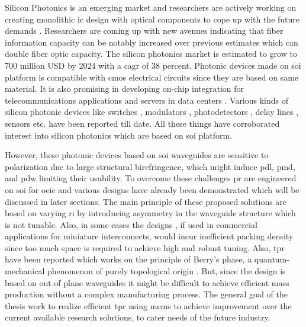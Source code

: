 \documentclass[../report.tex]{subfiles}
\begin{document}
Silicon Photonics is an emerging market and researchers are actively working on creating monolithic \gls{ic} design with optical components to cope up with the future demands \cite{optical_linking}. Researchers are coming up with new avenues indicating that fiber information capacity can be notably increased over previous estimates \cite{temprana_overcoming_2015} which can double fiber optic capacity. The silicon photonics market is estimated to grow to 700 million USD by 2024 \cite{silicon_photonics_growth_2015} with a \gls{cagr} of 38 percent. Photonic devices made on \gls{soi} platform is compatible with \gls{cmos} electrical circuits since they are based on same material. It is also promising in developing on-chip integration for telecommunications applications and servers in data centers \cite{jalali_silicon_2006}. Various kinds of silicon photonic devices like switches \cite{wu_mems-enabled_2015,nikolova_scaling_2015,lu_low-power_2014}, modulators \cite{dong_silicon_2015,chen_generation_2013}, photodetectors \cite{urino_demonstration_2012,chang_high-power_2015}, delay lines \cite{garcia_design_2015,mattarei_variable_2014}, sensors \cite{janz_silicon_2007,lim_laser_2010,ryckeboer_glucose_2014} etc. have been reported till date. All these things have corroborated interest into silicon photonics which are based on \gls{soi} platform.\par   

However, these photonic devices based on \gls{soi} waveguides are sensitive to polarization due to large structural birefringence, which might induce \gls{pdl}, \gls{pmd}, and \gls{pdw} limiting their usability. To overcome these challenges \gls{pr} are engineered on \gls{soi} for \gls{oeic} and various designs have already been demonstrated \cite{xie_efficient_2015,velasco_ultracompact_2012,leung_numerical_2011,wang_design_2014,dai_novel_2011,wirth_efficient_2012,chen_compact_2011} which will be discussed in later sections. The main principle of these proposed solutions are based on varying \gls{ri} by introducing asymmetry in the waveguide structure which is not tunable. Also, in some cases the designs \cite{sarmiento-merenguel_demonstration_2015}, if used in commercial applications for miniature interconnects, would incur inefficient packing density since too much space is required to achieve high and robust tuning. Also, \gls{tpr} have been reported which works on the principle of Berry’s phase, a quantum-mechanical phenomenon of purely topological origin \cite{xu_electrically_2014}. But, since the design is based on out of plane waveguides it might be difficult to achieve efficient mass production without a complex manufacturing process. The general goal of the thesis work to realize efficient \gls{tpr} using \gls{mems} to achieve improvement over the current available research solutions, to cater needs of the future industry.    
\end{document}
